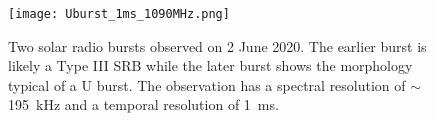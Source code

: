\begin{figure}
    \centering
    \texttt{[image: Uburst\_1ms\_1090MHz.png]}
    \caption[Two solar radio bursts observed on 2 June 2020.]{Two solar radio bursts observed on 2 June 2020. The earlier burst is likely a Type III SRB while the later burst shows the morphology typical of a U burst. The observation has a spectral resolution of $\sim$ \SI{195}{\kilo \hertz} and a temporal resolution of \SI{1}{\milli \second}.}
    \label{fig:uburst}
\end{figure}

%
%
%

